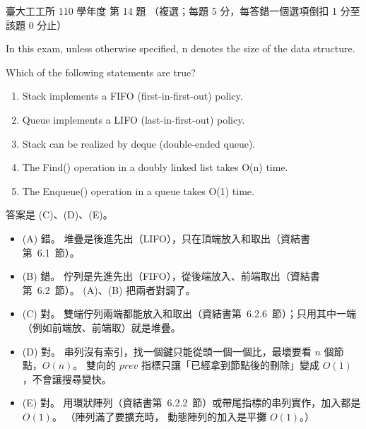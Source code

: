\begin{pastexam}[label={px:ntu-110-ie-ds-14}]{臺大工工所 110 學年度 第 14 題}
（複選；每題 5 分，每答錯一個選項倒扣 1 分至該題 0 分止）

In this exam, unless otherwise specified, n denotes the size of the data structure.

Which of the following statements are true?
\begin{enumerate}[label=(\Alph*)]
\item Stack implements a FIFO (first-in-first-out) policy.
\item Queue implements a LIFO (last-in-first-out) policy.
\item Stack can be realized by deque (double-ended queue).
\item The Find() operation in a doubly linked list takes O(n) time.
\item The Enqueue() operation in a queue takes O(1) time.
\end{enumerate}
\end{pastexam}

\begin{pastsoln}
答案是 (C)、(D)、(E)。

\begin{itemize}
\item (A) 錯。 堆疊是後進先出（LIFO），只在頂端放入和取出（資結書第~6.1~節）。
\item (B) 錯。 佇列是先進先出（FIFO），從後端放入、前端取出（資結書第~6.2~節）。 (A)、(B) 把兩者對調了。
\item (C) 對。 雙端佇列兩端都能放入和取出（資結書第~6.2.6~節）；只用其中一端（例如前端放、前端取）就是堆疊。
\item (D) 對。 串列沒有索引，找一個鍵只能從頭一個一個比，最壞要看 $n$ 個節點，$O(n)$。 雙向的
$\mathit{prev}$ 指標只讓「已經拿到節點後的刪除」變成 $O(1)$，不會讓搜尋變快。
\item (E) 對。 用環狀陣列（資結書第~6.2.2~節）或帶尾指標的串列實作，加入都是 $O(1)$。 （陣列滿了要擴充時，
動態陣列的加入是平攤 $O(1)$。）
\end{itemize}
\end{pastsoln}
